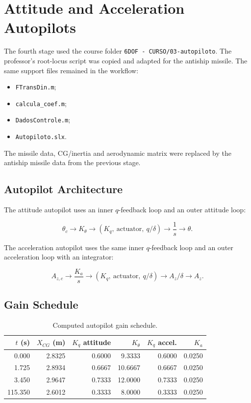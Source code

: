 \section{Attitude and Acceleration Autopilots}

The fourth stage used the course folder \texttt{6DOF - CURSO/03-autopiloto}. The professor's root-locus script was copied and adapted for the antiship missile. The same support files remained in the workflow:

\begin{itemize}
    \item \texttt{FTransDin.m};
    \item \texttt{calcula\_coef.m};
    \item \texttt{DadosControle.m};
    \item \texttt{Autopiloto.slx}.
\end{itemize}

The missile data, CG/inertia and aerodynamic matrix were replaced by the antiship missile data from the previous stage.

\subsection{Autopilot Architecture}

The attitude autopilot uses an inner \(q\)-feedback loop and an outer attitude loop:

\[
    \theta_c \rightarrow K_\theta \rightarrow
    \left(K_q,~\text{actuator},~q/\delta\right)
    \rightarrow \frac{1}{s} \rightarrow \theta.
\]

The acceleration autopilot uses the same inner \(q\)-feedback loop and an outer acceleration loop with an integrator:

\[
    A_{z,c} \rightarrow \frac{K_a}{s} \rightarrow
    \left(K_q,~\text{actuator},~q/\delta\right)
    \rightarrow A_z/\delta \rightarrow A_z.
\]

\subsection{Gain Schedule}

\begin{table}[H]
\centering
\caption{Computed autopilot gain schedule.}
\begin{tabular}{rrrrrr}
\toprule
\(t\) (s) & \(X_{CG}\) (m) & \(K_q\) attitude & \(K_\theta\) & \(K_q\) accel. & \(K_a\) \\
\midrule
0.000 & 2.8325 & 0.6000 & 9.3333 & 0.6000 & 0.0250 \\
1.725 & 2.8934 & 0.6667 & 10.6667 & 0.6667 & 0.0250 \\
3.450 & 2.9647 & 0.7333 & 12.0000 & 0.7333 & 0.0250 \\
115.350 & 2.6012 & 0.3333 & 8.0000 & 0.3333 & 0.0250 \\
\bottomrule
\end{tabular}
\end{table}


